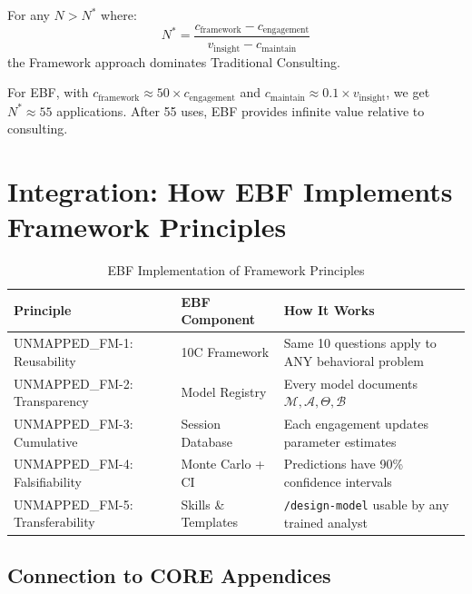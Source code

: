 \begin{proposition}
For any $N > N^*$ where:
\begin{equation}
N^* = \frac{c_{\text{framework}} - c_{\text{engagement}}}{v_{\text{insight}} - c_{\text{maintain}}}
\end{equation}
the Framework approach dominates Traditional Consulting.
\end{proposition}

For EBF, with $c_{\text{framework}} \approx 50 \times c_{\text{engagement}}$ and $c_{\text{maintain}} \approx 0.1 \times v_{\text{insight}}$, we get $N^* \approx 55$ applications. After 55 uses, EBF provides infinite value relative to consulting.


\section{Integration: How EBF Implements Framework Principles}
\label{sec:fm-integration}

\begin{table}[htbp]
\centering
\caption{EBF Implementation of Framework Principles}
\label{tab:fm-ebf-implementation}
\renewcommand{\arraystretch}{1.4}
\begin{tabular}{@{}p{3cm}p{4cm}p{6cm}@{}}
\toprule
\textbf{Principle} & \textbf{EBF Component} & \textbf{How It Works} \\
\midrule
UNMAPPED_FM-1: Reusability & 10C Framework & Same 10 questions apply to ANY behavioral problem \\
UNMAPPED_FM-2: Transparency & Model Registry & Every model documents $\mathcal{M}, \mathcal{A}, \Theta, \mathcal{B}$ \\
UNMAPPED_FM-3: Cumulative & Session Database & Each engagement updates parameter estimates \\
UNMAPPED_FM-4: Falsifiability & Monte Carlo + CI & Predictions have 90\% confidence intervals \\
UNMAPPED_FM-5: Transferability & Skills \& Templates & \texttt{/design-model} usable by any trained analyst \\
\bottomrule
\end{tabular}
\end{table}

\subsection{Connection to CORE Appendices}


